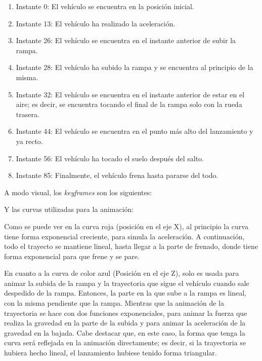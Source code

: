 \documentclass{article}
\begin{document}
\begin{enumerate}
    \item Instante 0: El vehículo se encuentra en la posición inicial.
    \item Instante 13: El vehículo ha realizado la aceleración.
    \item Instante 26: El vehículo se encuentra en el instante anterior de subir la rampa.
    \item Instante 28: El vehículo ha subido la rampa y se encuentra al principio de la misma.
    \item Instante 32: El vehículo se encuentra en el instante anterior de estar en el aire; es decir, se encuentra tocando el final de la rampa solo con la rueda trasera.
    \item Instante 44: El vehículo se encuentra en el punto más alto del lanzamiento y ya recto.
    \item Instante 56: El vehículo ha tocado el suelo después del salto.
    \item Instante 85: Finalmente, el vehículo frena hasta pararse del todo.
\end{enumerate}

A modo visual, los \textit{keyframes} son los siguientes:


Y las curvas utilizadas para la animación:


Como se puede ver en la curva roja (posición en el eje X), al principio la curva tiene forma exponencial creciente, para simula la aceleración. A continuación, todo el trayecto se mantiene lineal, hasta llegar a la parte de frenado, donde tiene forma exponencial para que frene y se pare.

En cuanto a la curva de color azul (Posición en el eje Z), solo es usada para animar la subida de la rampa y la trayectoria que sigue el vehículo cuando sale despedido de la rampa. Entonces, la parte en la que sube a la rampa es lineal, con la misma pendiente que la rampa. Mientras que la animación de la trayectoria se hace con dos funciones exponenciales, para animar la fuerza que realiza la gravedad en la parte de la subida y para animar la aceleración de la gravedad en la bajada. Cabe destacar que, en este caso, la forma que tenga la curva será reflejada en la animación directamente; es decir, si la trayectoria se hubiera hecho lineal, el lanzamiento hubiese tenido forma triangular.
\end{document}
